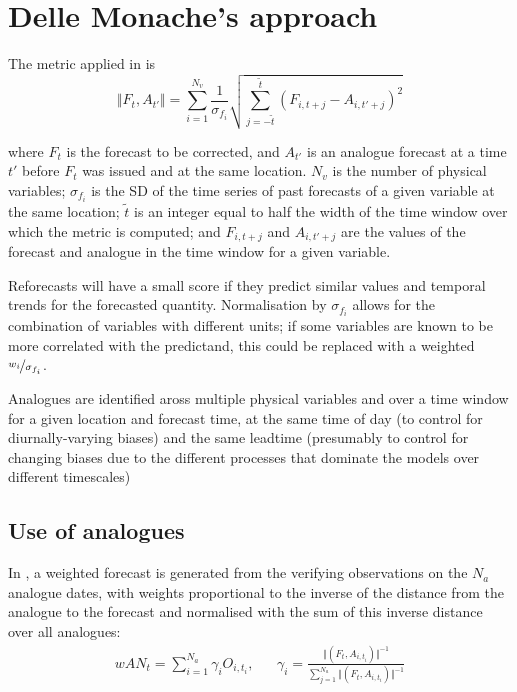\documentclass[10pt,fleqn]{article}
\begin{document}
\section{Delle Monache's approach}

The metric applied in \cite{DelleMonache2011} is
%
\[ \Vert F_t, A_{t'} \Vert = \sum_{i=1}^{N_v} \frac{1}{\sigma_{f_i}} \sqrt{\sum_{j=-\tilde{t}}^{\tilde{t}} \left( F_{i, t+j} - A_{i, t'+j}\right)^2}\]

where $F_t$ is the forecast to be corrected, and $A_{t'}$ is an analogue forecast at a time $t'$ before $F_t$ was issued and at the same location. $N_v$ is the number of physical variables; $\sigma_{f_i}$ is the SD of the time series of past forecasts of a given variable at the same location; $\tilde{t}$ is an integer equal to half the width of the time window over which the metric is computed; and $F_{i, t+j}$ and $A_{i, t'+j}$ are the values of the forecast and analogue in the time window for a given variable.

Reforecasts will have a small score if they predict similar values and temporal trends for the forecasted quantity. Normalisation by $\sigma_{f_i}$ allows for the combination of variables with different units; if some variables are known to be more correlated with the predictand, this could be replaced with a weighted $\nicefrac{w_i}{\sigma_{f_i}}$.

Analogues are identified aross multiple physical variables and over a time window for a given location and forecast time, at the same time of day (to control for diurnally-varying biases) and the same leadtime (presumably to control for changing biases due to the different processes that dominate the models over different timescales)

\subsection{Use of analogues}

In \cite{DelleMonache2011}, a weighted forecast is generated from the verifying observations on the $N_a$ analogue dates, with weights proportional to the inverse of the distance from the analogue to the forecast and normalised with the sum of this inverse distance over all analogues:
%
\begin{align*}
wAN_t = \sum_{i=1}^{N_a} \gamma_i O_{i, t_i}, && \gamma_i = \frac{\Vert(F_t, A_{i, t_i}) \Vert ^{-1}}{\sum\limits_{j=1}^{N_a} \Vert(F_t, A_{i, t_i}) \Vert ^{-1}} 
\end{align*}
\end{document}
